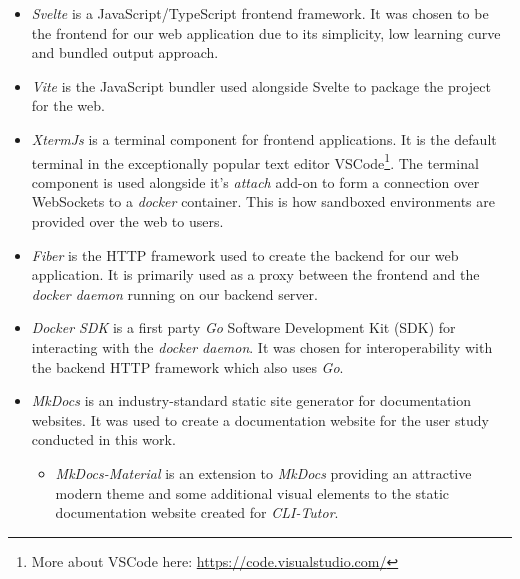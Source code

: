 \begin{itemize}
    \item \textit{Svelte} is a JavaScript/TypeScript frontend framework. It was
        chosen to be the frontend for our web application due to its
        simplicity, low learning curve and bundled output approach.

    \item \textit{Vite} is the JavaScript bundler used alongside Svelte to package the project for the web.

    \item \textit{XtermJs} is a terminal component for frontend applications.
        It is the default terminal in the exceptionally popular text
        editor VSCode\footnote{More about VSCode here:
        \url{https://code.visualstudio.com/}}. The terminal component is used
        alongside it's \textit{attach} add-on to form a connection over
        WebSockets to a \textit{docker} container. This is how sandboxed environments
        are provided over the web to users.

    \item \textit{Fiber} is the HTTP framework used to create the backend for
        our web application. It is primarily used as a proxy between the
        frontend and the \textit{docker daemon} running on our backend server.

    \item \textit{Docker SDK} is a first party \textit{Go} Software Development Kit
        (SDK) for interacting with the \textit{docker daemon}. It was chosen for
        interoperability with the backend HTTP framework which also uses \textit{Go}.

    \item \textit{MkDocs} is an industry-standard static site generator for
        documentation websites. It was used to create a documentation website
        for the user study conducted in this work.
        \begin{itemize}
            \item \textit{MkDocs-Material} is an extension to \textit{MkDocs}
                providing an attractive modern theme and some additional visual
                elements to the static documentation website created for
                \textit{CLI-Tutor}.
        \end{itemize}
\end{itemize}

